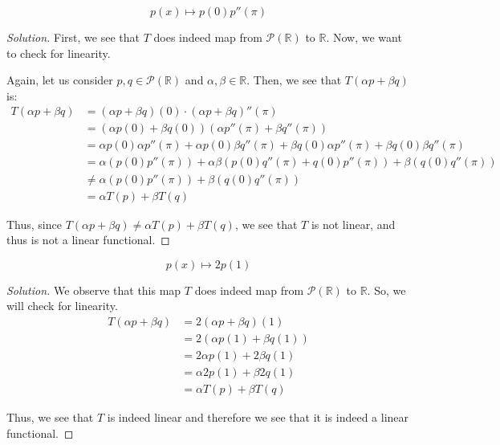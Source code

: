 \documentclass{article}
\newenvironment{solution}{\begin{proof}[Solution]}{\end{proof}}
\newcommand{\RR}{\mathbb{R}}
\begin{document}
	\begin{hw}
		\begin{equation*}
			p(x) \mapsto p(0)p''(\pi)
		\end{equation*}
	\end{hw}
	\begin{solution}
		First, we see that $T$ does indeed map from $\mathscr{P}(\RR)$ to $\RR$. Now, we want to check for linearity.
		
		Again, let us consider $p,q \in \mathscr{P}(\RR)$ and $\alpha, \beta \in \RR$. Then, we see that $T(\alpha p+\beta q)$ is:
		\begin{align*}
			T(\alpha p + \beta q) &= (\alpha p + \beta q)(0) \cdot (\alpha p + \beta q)''(\pi) \\
			&= (\alpha p(0) + \beta q(0))(\alpha p''(\pi) + \beta q''(\pi)) \\
			&= \alpha p(0)\alpha p''(\pi) + \alpha p(0)\beta q''(\pi) + \beta q(0)\alpha p''(\pi) + \beta q(0) \beta q''(\pi) \\
			&= \alpha (p(0)p''(\pi)) + \alpha\beta(p(0)q''(\pi) + q(0)p''(\pi)) + \beta(q(0)q''(\pi)) \\
			&\neq \alpha(p(0)p''(\pi)) + \beta(q(0)q''(\pi)) \\
			&= \alpha T(p) + \beta T(q)
		\end{align*}
	
		Thus, since $T(\alpha p + \beta q) \neq \alpha T(p) + \beta T(q)$, we see that $T$ is not linear, and thus is not a linear functional.
	\end{solution}

	\begin{hw}
		\begin{equation*}
			p(x) \mapsto 2p(1)
		\end{equation*}
	\end{hw}
	\begin{solution}
		We observe that this map $T$ does indeed map from $\mathscr{P}(\RR)$ to $\RR$. So, we will check for linearity.
		\begin{align*}
			T(\alpha p + \beta q) &= 2(\alpha p + \beta q)(1) \\
			&= 2(\alpha p(1) + \beta q(1)) \\
			&= 2 \alpha p(1) + 2 \beta q(1) \\
			&= \alpha 2p(1) + \beta 2q(1) \\
			&= \alpha T(p) + \beta T(q)
		\end{align*}
	
		Thus, we see that $T$ is indeed linear and therefore we see that it is indeed a linear functional.
	\end{solution}
\end{document}
